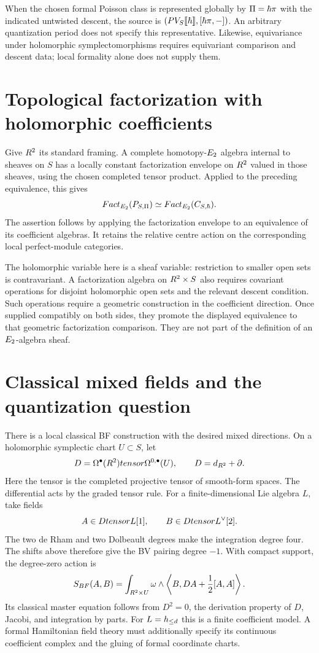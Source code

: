When the chosen formal Poisson class is represented globally by
$\Pi=\hbar\pi$ with the indicated untwisted descent, the source is
$(PV_S\llbracket\hbar\rrbracket,[\hbar\pi,-])$.
An arbitrary quantization period does not specify this representative.
Likewise, equivariance under holomorphic symplectomorphisms requires
equivariant comparison and descent data; local formality alone does
not supply them.

\section{Topological factorization with holomorphic coefficients}
Give $R^2$ its standard framing.  A complete homotopy-$E_2$
algebra internal to sheaves on $S$ has a locally constant
factorization envelope on $R^2$ valued in those sheaves, using the
chosen completed tensor product.  Applied to the preceding equivalence,
this gives
\[
 Fact_{E_2}(P_{S,\Pi})
 \simeq Fact_{E_2}(C_{S,\hbar}).
\]
The assertion follows by applying the factorization envelope to an
equivalence of its coefficient algebras.
It retains the relative centre action on the corresponding local
perfect-module categories.

The holomorphic variable here is a sheaf variable: restriction to
smaller open sets is contravariant.  A factorization algebra on
$R^2\times S$ also requires covariant operations for disjoint
holomorphic open sets and the relevant descent condition.
Such operations require a geometric construction in the coefficient
direction.  Once supplied compatibly on both sides, they promote the
displayed equivalence to that geometric factorization comparison.
They are not part of the definition of an $E_2$-algebra sheaf.

\section{Classical mixed fields and the quantization question}
There is a local classical BF construction with the desired mixed
directions.  On a holomorphic symplectic chart $U\subset S$, let
\[
 D=\Omega^\bullet(R^2)tensor
                \Omega^{0,\bullet}(U),
 \qquad D=d_{R^2}+\partial.
\]
Here the tensor is the completed projective tensor of smooth-form
spaces.  The differential acts by the graded tensor rule.
For a finite-dimensional Lie algebra $L$, take fields
\[
 A\in Dtensor L[1],\qquad
 B\in Dtensor L^\vee[2].
\]
The two de Rham and two Dolbeault degrees make the integration degree
four.  The shifts above therefore give the BV pairing degree $-1$.
With compact support, the degree-zero action is
\[
 S_{BF}(A,B)
 =\int_{R^2\times U}\omega\wedge
     \left\langle B,DA+\frac12[A,A]\right\rangle.
\]
Its classical master equation follows from $D^2=0$, the derivation
property of $D$, Jacobi, and integration by parts.
For $L=h_{\le d}$ this is a finite coefficient model.
A formal Hamiltonian field theory must additionally specify its
continuous coefficient complex and the gluing of formal coordinate
charts.

